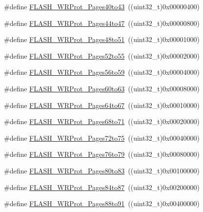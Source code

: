\begin{DoxyCompactItemize}
\item 
\#define \hyperlink{group__Option__Bytes__Write__Protection_ga30798723c36db2b8145b6a5c8ffafded}{FLASH\_\-WRProt\_\-Pages40to43}~((uint32\_\-t)0x00000400)
\item 
\#define \hyperlink{group__Option__Bytes__Write__Protection_gaa2d897455d5f71c9fd3721d49b3578fc}{FLASH\_\-WRProt\_\-Pages44to47}~((uint32\_\-t)0x00000800)
\item 
\#define \hyperlink{group__Option__Bytes__Write__Protection_gac6bb79080cb276b330499f26c706048e}{FLASH\_\-WRProt\_\-Pages48to51}~((uint32\_\-t)0x00001000)
\item 
\#define \hyperlink{group__Option__Bytes__Write__Protection_gab5beefbfebf060f71421995f3c7a6418}{FLASH\_\-WRProt\_\-Pages52to55}~((uint32\_\-t)0x00002000)
\item 
\#define \hyperlink{group__Option__Bytes__Write__Protection_ga3705c210feeeb63c31976495c0b851f1}{FLASH\_\-WRProt\_\-Pages56to59}~((uint32\_\-t)0x00004000)
\item 
\#define \hyperlink{group__Option__Bytes__Write__Protection_ga1978945fc02d1867900f17c4999c50d5}{FLASH\_\-WRProt\_\-Pages60to63}~((uint32\_\-t)0x00008000)
\item 
\#define \hyperlink{group__Option__Bytes__Write__Protection_ga124928d6134ddac13e3e8810a0d8dd1a}{FLASH\_\-WRProt\_\-Pages64to67}~((uint32\_\-t)0x00010000)
\item 
\#define \hyperlink{group__Option__Bytes__Write__Protection_gafbb813885c6cd505c64083f2f88532fb}{FLASH\_\-WRProt\_\-Pages68to71}~((uint32\_\-t)0x00020000)
\item 
\#define \hyperlink{group__Option__Bytes__Write__Protection_ga1a19c52012bbb30f3ae1599fa5a200cc}{FLASH\_\-WRProt\_\-Pages72to75}~((uint32\_\-t)0x00040000)
\item 
\#define \hyperlink{group__Option__Bytes__Write__Protection_ga9e1f9abfa57766312c6cbae9b42f3ab6}{FLASH\_\-WRProt\_\-Pages76to79}~((uint32\_\-t)0x00080000)
\item 
\#define \hyperlink{group__Option__Bytes__Write__Protection_ga5749428874f99f77a5c5fc48a88816d9}{FLASH\_\-WRProt\_\-Pages80to83}~((uint32\_\-t)0x00100000)
\item 
\#define \hyperlink{group__Option__Bytes__Write__Protection_ga9dbf7aeb5b54b42f9b345c95d00eaf32}{FLASH\_\-WRProt\_\-Pages84to87}~((uint32\_\-t)0x00200000)
\item 
\#define \hyperlink{group__Option__Bytes__Write__Protection_gaeece6aa5e198239067c47f678b9d015e}{FLASH\_\-WRProt\_\-Pages88to91}~((uint32\_\-t)0x00400000)

\end{DoxyCompactItemize}

